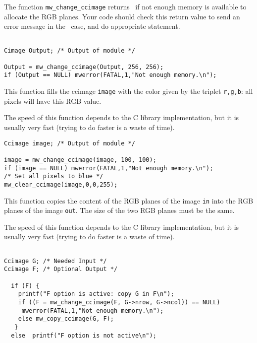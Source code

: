 The function \verb+mw_change_ccimage+ returns \Null\ if not enough memory is available to allocate the RGB planes. Your code should check this return value to 
send an error message in the \Null\ case, and do appropriate statement.

\Next
\Example
\begin{verbatim}

Cimage Output; /* Output of module */

Output = mw_change_ccimage(Output, 256, 256);
if (Output == NULL) mwerror(FATAL,1,"Not enough memory.\n");

\end{verbatim}

\newpage %
\Description
This function fills the ccimage \verb+image+ with the color given by 
the triplet \verb+r,g,b+: all pixels will have this RGB value.

The speed of this function depends to the C library implementation, but it is
usually very fast (trying to do faster is a waste of time).

\Next
\Example
\begin{verbatim}
Ccimage image; /* Output of module */

image = mw_change_ccimage(image, 100, 100);
if (image == NULL) mwerror(FATAL,1,"Not enough memory.\n");
/* Set all pixels to blue */
mw_clear_ccimage(image,0,0,255);

\end{verbatim}

\newpage %
\Description
This function copies the content of the RGB planes of the image \verb+in+ into 
the RGB planes of the image \verb+out+.
The size of the two RGB planes must be the same.

The speed of this function depends to the C library implementation, but it is
usually very fast (trying to do faster is a waste of time).

\Next
\Example
\begin{verbatim}

Ccimage G; /* Needed Input */
Ccimage F; /* Optional Output */

  if (F) {
    printf("F option is active: copy G in F\n");
    if ((F = mw_change_ccimage(F, G->nrow, G->ncol)) == NULL)
     mwerror(FATAL,1,"Not enough memory.\n");
    else mw_copy_ccimage(G, F);
   }
  else  printf("F option is not active\n");
\end{verbatim}

